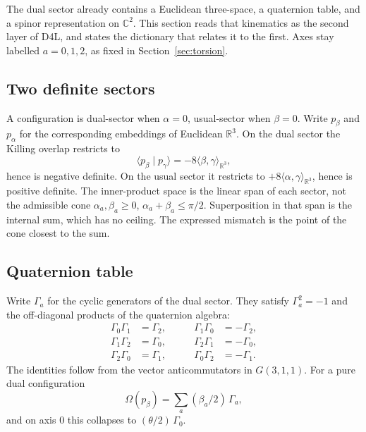 \documentclass[a4paper]{article}
\theoremstyle{definition}
\begin{document}
The dual sector already contains a Euclidean three-space, a quaternion
table, and a spinor representation on \(\mathbb{C}^2\). This section
reads that kinematics as the second layer of D4L, and states the
dictionary that relates it to the first. Axes stay labelled
\(a=0,1,2\), as fixed in Section~\ref{sec:torsion}.

\subsection{Two definite sectors}
\label{sec:sector}

A configuration is dual-sector when \(\alpha=0\), usual-sector when
\(\beta=0\). Write \(p_\beta\) and \(p_\alpha\) for the corresponding
embeddings of Euclidean \(\mathbb{R}^3\). On the dual sector the
Killing overlap restricts to
\[
\langle p_\beta\mid p_\gamma\rangle
=-8\langle\beta,\gamma\rangle_{\mathbb{R}^3},
\]
hence is negative definite. On the usual sector it restricts to
\(+8\langle\alpha,\gamma\rangle_{\mathbb{R}^3}\), hence is positive
definite. The inner-product space is the linear span of each sector,
not the admissible cone \(\alpha_a,\beta_a\ge 0\),
\(\alpha_a+\beta_a\le\pi/2\). Superposition in that span is the internal
sum, which has no ceiling. The expressed mismatch is the point of the
cone closest to the sum.

\subsection{Quaternion table}
\label{sec:quat}

Write \(\Gamma_a\) for the cyclic generators of the dual sector. They
satisfy \(\Gamma_a^2=-1\) and the off-diagonal products of the
quaternion algebra:
\[
\begin{aligned}
\Gamma_0\Gamma_1&=\Gamma_2,\\
\Gamma_1\Gamma_2&=\Gamma_0,\\
\Gamma_2\Gamma_0&=\Gamma_1,
\end{aligned}
\qquad
\begin{aligned}
\Gamma_1\Gamma_0&=-\Gamma_2,\\
\Gamma_2\Gamma_1&=-\Gamma_0,\\
\Gamma_0\Gamma_2&=-\Gamma_1.
\end{aligned}
\]
The identities follow from the vector anticommutators in \(G(3,1,1)\).
For a pure dual configuration
\[
\Omega(p_\beta)=\sum_a(\beta_a/2)\,\Gamma_a,
\]
and on axis \(0\) this collapses to \((\theta/2)\,\Gamma_0\).
\end{document}

